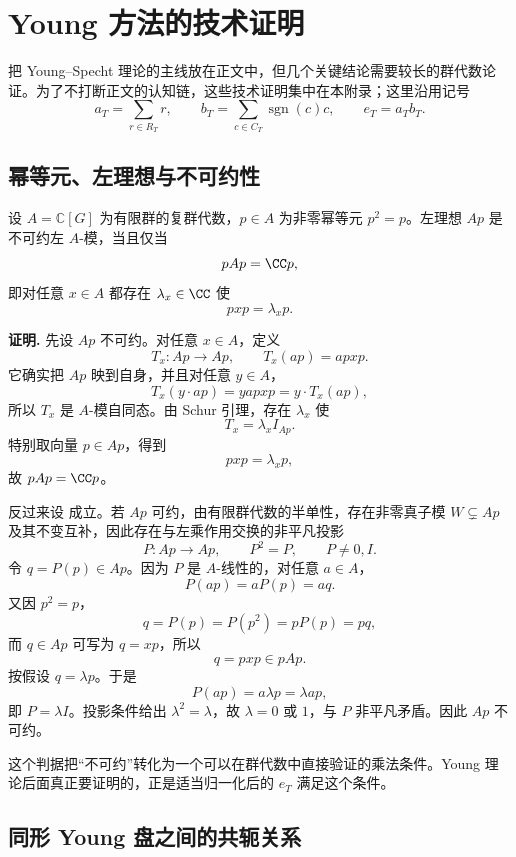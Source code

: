 \chapter{Young 方法的技术证明}
\label{app:young-proofs}

把 Young--Specht 理论的主线放在正文中，但几个关键结论需要较长的群代数论证。为了不打断正文的认知链，这些技术证明集中在本附录；这里沿用记号
\[
a_T=\sum_{r\in R_T}r,
\qquad
b_T=\sum_{c\in C_T}\operatorname{sgn}(c)c,
\qquad
 e_T=a_Tb_T.
\]

\section{幂等元、左理想与不可约性}

\begin{theorem}[本原幂等元判据]
设 $A=\mathbb C[G]$ 为有限群的复群代数，$p\in A$ 为非零幂等元 $p^2=p$。左理想 $Ap$ 是不可约左 $A$-模，当且仅当
\begin{equation}
pAp=\CC p,
\label{eq:primitive-idempotent-criterion}
\end{equation}
即对任意 $x\in A$ 都存在 $\lambda_x\in\CC$ 使
\[
pxp=\lambda_xp.
\]

\par\smallskip\noindent\textbf{证明.}
先设 $Ap$ 不可约。对任意 $x\in A$，定义
\[
T_x:Ap\to Ap,
\qquad
T_x(ap)=apxp.
\]
它确实把 $Ap$ 映到自身，并且对任意 $y\in A$，
\[
T_x(y\cdot ap)=yapxp=y\cdot T_x(ap),
\]
所以 $T_x$ 是 $A$-模自同态。由 Schur 引理，存在 $\lambda_x$ 使
\[
T_x=\lambda_x I_{Ap}.
\]
特别取向量 $p\in Ap$，得到
\[
pxp=\lambda_xp,
\]
故 $pAp=\CC p$。

反过来设  成立。若 $Ap$ 可约，由有限群代数的半单性，存在非零真子模 $W\subsetneq Ap$ 及其不变互补，因此存在与左乘作用交换的非平凡投影
\[
P:Ap\to Ap,
\qquad
P^2=P,
\qquad P\neq0,I.
\]
令 $q=P(p)\in Ap$。因为 $P$ 是 $A$-线性的，对任意 $a\in A$，
\[
P(ap)=aP(p)=aq.
\]
又因 $p^2=p$，
\[
q=P(p)=P(p^2)=pP(p)=pq,
\]
而 $q\in Ap$ 可写为 $q=xp$，所以
\[
q=pxp\in pAp.
\]
按假设 $q=\lambda p$。于是
\[
P(ap)=a\lambda p=\lambda ap,
\]
即 $P=\lambda I$。投影条件给出 $\lambda^2=\lambda$，故 $\lambda=0$ 或 $1$，与 $P$ 非平凡矛盾。因此 $Ap$ 不可约。
\end{theorem}

这个判据把“不可约”转化为一个可以在群代数中直接验证的乘法条件。Young 理论后面真正要证明的，正是适当归一化后的 $e_T$ 满足这个条件。

\section{同形 Young 盘之间的共轭关系}

